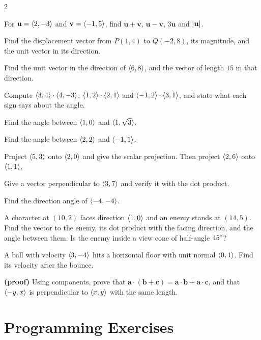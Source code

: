 \begin{multicols}{2}
\begin{exercises}
\item For $\mathbf{u} = \langle 2, -3 \rangle$ and $\mathbf{v} = \langle -1, 5 \rangle$, find $\mathbf{u} + \mathbf{v}$, $\mathbf{u} - \mathbf{v}$, $3\mathbf{u}$ and $\lvert \mathbf{u} \rvert$.
\item Find the displacement vector from $P(1, 4)$ to $Q(-2, 8)$, its magnitude, and the unit vector in its direction.
\item Find the unit vector in the direction of $\langle 6, 8 \rangle$, and the vector of length $15$ in that direction.
\item Compute $\langle 3, 4 \rangle \cdot \langle 4, -3 \rangle$, $\langle 1, 2 \rangle \cdot \langle 2, 1 \rangle$ and $\langle -1, 2 \rangle \cdot \langle 3, 1 \rangle$, and state what each sign says about the angle.
\item Find the angle between $\langle 1, 0 \rangle$ and $\langle 1, \sqrt{3} \rangle$.
\item Find the angle between $\langle 2, 2 \rangle$ and $\langle -1, 1 \rangle$.
\item Project $\langle 5, 3 \rangle$ onto $\langle 2, 0 \rangle$ and give the scalar projection. Then project $\langle 2, 6 \rangle$ onto $\langle 1, 1 \rangle$.
\item Give a vector perpendicular to $\langle 3, 7 \rangle$ and verify it with the dot product.
\item Find the direction angle of $\langle -4, -4 \rangle$.
\item A character at $(10, 2)$ faces direction $\langle 1, 0 \rangle$ and an enemy stands at $(14, 5)$. Find the vector to the enemy, its dot product with the facing direction, and the angle between them. Is the enemy inside a view cone of half-angle $45^\circ$?
\item A ball with velocity $\langle 3, -4 \rangle$ hits a horizontal floor with unit normal $\langle 0, 1 \rangle$. Find its velocity after the bounce.
\item \textbf{(proof)} Using components, prove that $\mathbf{a} \cdot (\mathbf{b} + \mathbf{c}) = \mathbf{a} \cdot \mathbf{b} + \mathbf{a} \cdot \mathbf{c}$, and that $\langle -y, x \rangle$ is perpendicular to $\langle x, y \rangle$ with the same length.
\end{exercises}
\end{multicols}

\section{Programming Exercises}

